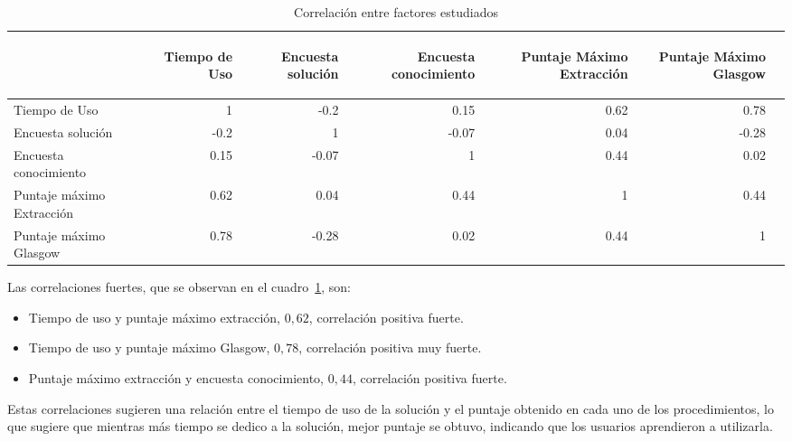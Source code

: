 \begin{table}[H]
\centering
\caption{Correlación entre factores estudiados} 
\begin{tabular}{lrrrrrr}
\toprule
        &
\begin{sideways}\textbf{Tiempo de Uso}\end{sideways}             &
\begin{sideways}\textbf{Encuesta solución}\end{sideways}        &
\begin{sideways}\textbf{Encuesta conocimiento}\end{sideways}         &
\begin{sideways}\textbf{Puntaje Máximo Extracción}\end{sideways} &
\begin{sideways}\textbf{Puntaje Máximo Glasgow}\end{sideways}    \\
\midrule
Tiempo de Uso             & 1    & -0.2  & 0.15  & 0.62 & 0.78 \\
Encuesta solución         & -0.2 & 1     & -0.07 & 0.04 & -0.28\\
Encuesta conocimiento     & 0.15 & -0.07 & 1     & 0.44 & 0.02 \\
Puntaje máximo Extracción & 0.62 & 0.04  & 0.44  & 1    & 0.44 \\
Puntaje máximo Glasgow    & 0.78 & -0.28 & 0.02  & 0.44 & 1    \\
\bottomrule               
\end{tabular}

\label{tab:all_correlation}
\end{table}

Las correlaciones fuertes, que se observan en el 
cuadro~\ref{tab:all_correlation}, son:

\begin{itemize}
    \item Tiempo de uso y puntaje máximo extracción, $0,62$, correlación
        positiva fuerte.
    \item Tiempo de uso y puntaje máximo Glasgow, $0,78$, correlación positiva
        muy fuerte.
    \item Puntaje máximo extracción y encuesta conocimiento, $0,44$, correlación
        positiva fuerte.
\end{itemize}

Estas correlaciones sugieren una relación entre el tiempo de uso de la solución
y el puntaje obtenido en cada uno de los procedimientos, lo que sugiere que
mientras más tiempo se dedico a la solución, mejor puntaje se obtuvo, indicando
que los usuarios aprendieron a utilizarla.




